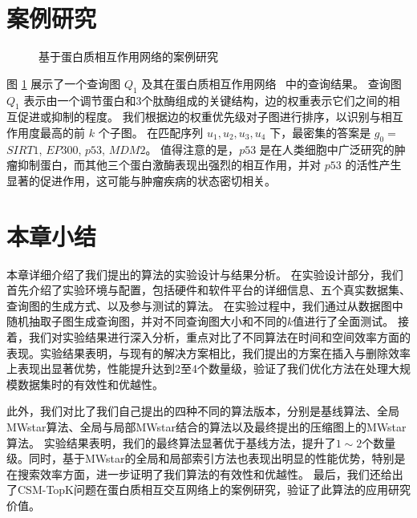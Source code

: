 \section{案例研究}
\begin{figure}[h!]
    \centering
    \caption{基于蛋白质相互作用网络的案例研究}
    \label{fig:human-caseStudy}
    \end{figure}    
图 \ref{fig:human-caseStudy} 展示了一个查询图 $Q_1$ 及其在蛋白质相互作用网络~\cite{dat-protein} 中的查询结果。
    查询图$Q_1$ 表示由一个调节蛋白和3个肽酶组成的关键结构，边的权重表示它们之间的相互促进或抑制的程度。
    我们根据边的权重优先级对子图进行排序，以识别与相互作用度最高的前 $k$ 个子图。
    在匹配序列 ${u_1, u_2, u_3, u_4}$ 下，最密集的答案是 $g_0=${$SIRT1$, $EP300$, $p53$, $MDM2$}。
    值得注意的是，$p53$ 是在人类细胞中广泛研究的肿瘤抑制蛋白，而其他三个蛋白激酶表现出强烈的相互作用，并对 $p53$ 的活性产生显著的促进作用，这可能与肿瘤疾病的状态密切相关。
\section{本章小结}
本章详细介绍了我们提出的算法的实验设计与结果分析。
在实验设计部分，我们首先介绍了实验环境与配置，包括硬件和软件平台的详细信息、五个真实数据集、查询图的生成方式、以及参与测试的算法。
在实验过程中，我们通过从数据图中随机抽取子图生成查询图，并对不同查询图大小和不同的$k$值进行了全面测试。
接着，我们对实验结果进行深入分析，重点对比了不同算法在时间和空间效率方面的表现。实验结果表明，与现有的解决方案相比，我们提出的方案在插入与删除效率上表现出显著优势，性能提升达到2至4个数量级，验证了我们优化方法在处理大规模数据集时的有效性和优越性。

此外，我们对比了我们自己提出的四种不同的算法版本，分别是基线算法、全局MWstar算法、全局与局部MWstar结合的算法以及最终提出的压缩图上的MWstar算法。
实验结果表明，我们的最终算法显著优于基线方法，提升了$1\sim2$个数量级。同时，基于MWstar的全局和局部索引方法也表现出明显的性能优势，特别是在搜索效率方面，进一步证明了我们算法的有效性和优越性。
最后，我们还给出了CSM-TopK问题在蛋白质相互交互网络上的案例研究，验证了此算法的应用研究价值。